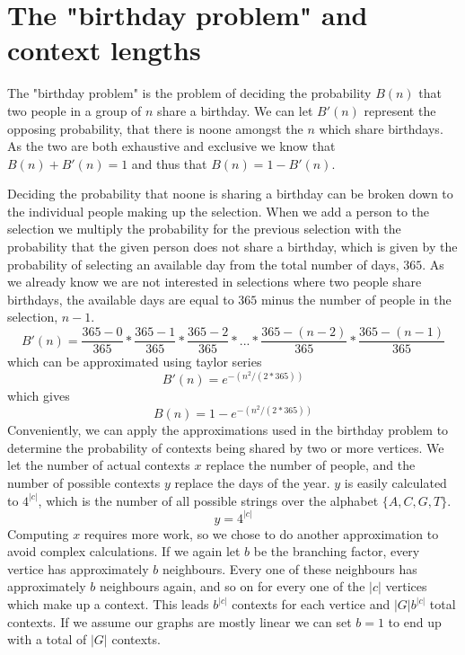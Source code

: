 \documentclass[thesis.tex]{subfiles}
\begin{document}
\chapter{The "birthday problem" and context lengths}
\label{sec:birthday_problem}
The "birthday problem" is the problem of deciding the probability $B(n)$ that two people in a group of $n$ share a birthday. We can let $B'(n)$ represent the opposing probability, that there is noone amongst the $n$ which share birthdays. As the two are both exhaustive and exclusive we know that $B(n)+B'(n)=1$ and thus that $B(n)=1-B'(n)$.\\
\par\noindent
Deciding the probability that noone is sharing a birthday can be broken down to the individual people making up the selection. When we add a person to the selection we multiply the probability for the previous selection with the probability that the given person does not share a birthday, which is given by the probability of selecting an available day from the total number of days, $365$. As we already know we are not interested in selections where two people share birthdays, the available days are equal to $365$ minus the number of people in the selection, $n-1$.
\begin{equation}
	B'(n)=\dfrac{365-0}{365} * \dfrac{365-1}{365} * \dfrac{365-2}{365} * ... * \dfrac{365-(n-2)}{365} * \dfrac{365-(n-1)}{365}
\end{equation}
which can be approximated using taylor series \cite{understanding_the_birthday_problem}
\begin{equation}
	B'(n)=e^{-(n^2/(2*365))}
\end{equation}
which gives
\begin{equation}
	B(n)=1-e^{-(n^2/(2*365))}
\end{equation}
Conveniently, we can apply the approximations used in the birthday problem to determine the probability of contexts being shared by two or more vertices. We let the number of actual contexts $x$ replace the number of people, and the number of possible contexts $y$ replace the days of the year. $y$ is easily calculated to $4^|c|$, which is the number of all possible strings over the alphabet $\{A, C, G, T\}$.
\begin{equation}
	y=4^{|c|}
\end{equation}
Computing $x$ requires more work, so we chose to do another approximation to avoid complex calculations. If we again let $b$ be the branching factor, every vertice has approximately $b$ neighbours. Every one of these neighbours has approximately $b$ neighbours again, and so on for every one of the $|c|$ vertices which make up a context. This leads $b^|c|$ contexts for each vertice and $|G|b^|c|$ total contexts. If we assume our graphs are mostly linear we can set $b=1$ to end up with a total of $|G|$ contexts. 
\end{document}
